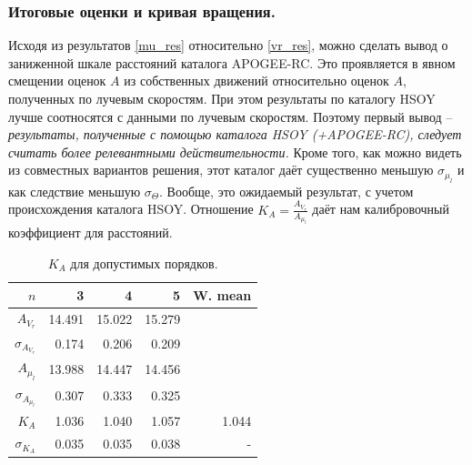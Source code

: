 \documentclass{matmex-diploma-custom}
\begin{document}
\subsubsection{Итоговые оценки и кривая вращения.}
Исходя из результатов \ref{mu_res} относительно \ref{vr_res}, можно сделать вывод о заниженной шкале расстояний каталога APOGEE-RC. Это проявляется в явном смещении оценок $A$ из собственных движений относительно оценок $A$, полученных по лучевым скоростям. При этом результаты по каталогу HSOY лучше соотносятся с данными по лучевым скоростям. Поэтому первый вывод -- \textit{результаты, полученные с помощью каталога HSOY (+APOGEE-RC), следует считать более релевантными действительности.} Кроме того, как можно видеть из совместных вариантов решения, этот каталог даёт существенно меньшую $\sigma_{\mu_l}$ и как следствие меньшую $\sigma_{\Theta}$. Вообще, это ожидаемый результат, с учетом происхождения каталога HSOY. Отношение $K_A = \frac{A_{V_r}}{A_{\mu_l}}$ даёт нам калибровочный коэффициент для расстояний. 

\begin{table}[h!!] 
\centering
\caption{$K_A$ для допустимых порядков.}
\begin{tabular}{r|rrr|r}
        $ n$ & 3 & 4 & 5 & W. mean\\
\hline
\hline
$A_{V_r} $& 14.491     &    15.022 &  15.279  &\\
$\sigma_{A_{V_r}}$& 0.174     &  0.206 &   0.209  &\\
$A_{\mu_l} $& 13.988     &  14.447 & 14.456  &\\
$\sigma_{A_{\mu_l}}$& 0.307     & 0.333 & 0.325  &\\
\hline
$K_A$& 1.036     &   1.040 &  1.057  & 1.044\\
$ \sigma_{K_A}$& 0.035     & 0.035 &  0.038  & -\\
\end{tabular}
\end{table}
\end{document}
